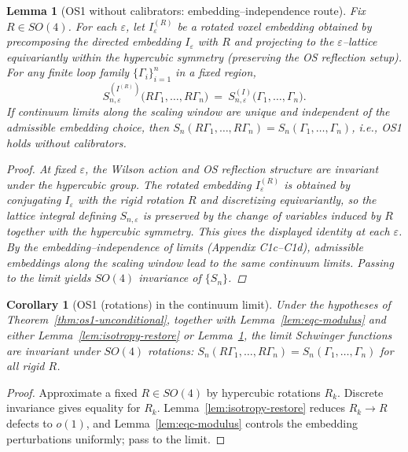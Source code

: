 \documentclass[11pt]{amsart}
\theoremstyle{plain}
\newtheorem{lemma}[theorem]{Lemma}
\newtheorem{corollary}[theorem]{Corollary}
\theoremstyle{definition}
\theoremstyle{remark}
\begin{document}
\begin{lemma}[OS1 without calibrators: embedding–independence route]\label{lem:os1-embedding}
Fix $R\in SO(4)$. For each $\varepsilon$, let $I^{(R)}_\varepsilon$ be a rotated voxel embedding obtained by precomposing the directed embedding $I_\varepsilon$ with $R$ and projecting to the $\varepsilon$–lattice equivariantly within the hypercubic symmetry (preserving the OS reflection setup). For any finite loop family $\{\Gamma_i\}_{i=1}^n$ in a fixed region,
\[
  S_{n,\varepsilon}^{(I^{(R)})}\big(R\Gamma_1,\dots,R\Gamma_n\big)
  \
  =\ S_{n,\varepsilon}^{(I)}\big(\Gamma_1,\dots,\Gamma_n\big).
\]
If continuum limits along the scaling window are unique and independent of the admissible embedding choice, then $S_n(R\Gamma_1,\dots,R\Gamma_n)=S_n(\Gamma_1,\dots,\Gamma_n)$, i.e., OS1 holds without calibrators.
\begin{proof}
At fixed $\varepsilon$, the Wilson action and OS reflection structure are invariant under the hypercubic group. The rotated embedding $I^{(R)}_\varepsilon$ is obtained by conjugating $I_\varepsilon$ with the rigid rotation $R$ and discretizing equivariantly, so the lattice integral defining $S_{n,\varepsilon}$ is preserved by the change of variables induced by $R$ together with the hypercubic symmetry. This gives the displayed identity at each $\varepsilon$. By the embedding–independence of limits (Appendix C1c–C1d), admissible embeddings along the scaling window lead to the same continuum limits. Passing to the limit yields $SO(4)$ invariance of $\{S_n\}$.
\end{proof}
\end{lemma}
\begin{corollary}[OS1 (rotations) in the continuum limit]\label{cor:os1-rotations}
Under the hypotheses of Theorem~\ref{thm:os1-unconditional}, together with Lemma~\ref{lem:eqc-modulus} and either Lemma~\ref{lem:isotropy-restore} or Lemma~\ref{lem:os1-embedding}, the limit Schwinger functions are invariant under $SO(4)$ rotations: $S_n(R\Gamma_1,\dots,R\Gamma_n)=S_n(\Gamma_1,\dots,\Gamma_n)$ for all rigid $R$.
\end{corollary}
\begin{proof}
Approximate a fixed $R\in SO(4)$ by hypercubic rotations $R_k$. Discrete invariance gives equality for $R_k$. Lemma~\ref{lem:isotropy-restore} reduces $R_k\to R$ defects to $o(1)$, and Lemma~\ref{lem:eqc-modulus} controls the embedding perturbations uniformly; pass to the limit.
\end{proof}
\end{document}
